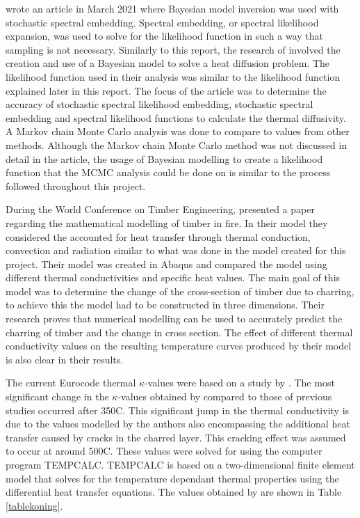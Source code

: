 \citeauthor{Wagner:2021} wrote an article in March 2021 where Bayesian model inversion was used with stochastic spectral embedding.
Spectral embedding, or spectral likelihood expansion, was used to solve for the likelihood function in such a way that sampling is not necessary.
Similarly to this report, the research of \citet{Wagner:2021} involved the creation and use of a Bayesian model to solve a heat diffusion problem.
The likelihood function used in their analysis was similar to the likelihood function explained later in this report.
The focus of the article was to determine the accuracy of stochastic spectral likelihood embedding, stochastic spectral embedding and spectral likelihood functions to calculate the thermal diffusivity.
A Markov chain Monte Carlo analysis was done to compare to values from other methods.
Although the Markov chain Monte Carlo method was not discussed in detail in the article, the usage of Bayesian modelling to create a likelihood function that the MCMC analysis could be done on is similar to the process followed throughout this project.

During the World Conference on Timber Engineering, \citet{Thi:2016} presented a paper regarding the mathematical modelling of timber in fire. 
In their model they considered the accounted for heat transfer through thermal conduction, convection and radiation similar to what was done in the model created for this project.
Their model was created in Abaqus and compared the model using different thermal conductivities and specific heat values.
The main goal of this model was to determine the change of the cross-section of timber due to charring, to achieve this the model had to be constructed in three dimensions.
Their research proves that numerical modelling can be used to accurately predict the charring of timber and the change in cross section.
The effect of different thermal conductivity values on the resulting temperature curves produced by their model is also clear in their results.


The current Eurocode thermal $\kappa$-values were based on a study by \citet{Koning:1999}.
The most significant change in the $\kappa$-values obtained by \citeauthor{Koning:1999} compared to those of previous studies occurred after 350\textdegree C. 
This significant jump in the thermal conductivity is due to the values modelled by the authors also encompassing the additional heat transfer caused by cracks in the charred layer.
This cracking effect was assumed to occur at around 500\textdegree C.
These values were solved for using the computer program TEMPCALC.
TEMPCALC is based on a two-dimensional finite element model that solves for the temperature dependant thermal properties using the differential heat transfer equations.
The values obtained by \citeauthor{Koning:1999} are shown in Table \ref{tablekoning}.

